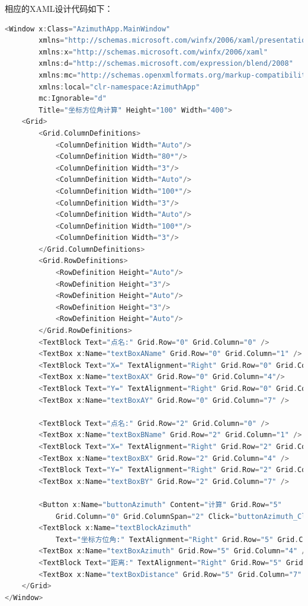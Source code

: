 相应的XAML设计代码如下：

\begin{lstlisting}[language=C]
<Window x:Class="AzimuthApp.MainWindow"
        xmlns="http://schemas.microsoft.com/winfx/2006/xaml/presentation"
        xmlns:x="http://schemas.microsoft.com/winfx/2006/xaml"
        xmlns:d="http://schemas.microsoft.com/expression/blend/2008"
        xmlns:mc="http://schemas.openxmlformats.org/markup-compatibility/2006"
        xmlns:local="clr-namespace:AzimuthApp"
        mc:Ignorable="d"
        Title="坐标方位角计算" Height="100" Width="400">
    <Grid>
        <Grid.ColumnDefinitions>
            <ColumnDefinition Width="Auto"/>
            <ColumnDefinition Width="80*"/>
            <ColumnDefinition Width="3"/>
            <ColumnDefinition Width="Auto"/>
            <ColumnDefinition Width="100*"/>
            <ColumnDefinition Width="3"/>
            <ColumnDefinition Width="Auto"/>
            <ColumnDefinition Width="100*"/>
            <ColumnDefinition Width="3"/>
        </Grid.ColumnDefinitions>
        <Grid.RowDefinitions>
            <RowDefinition Height="Auto"/>
            <RowDefinition Height="3"/>
            <RowDefinition Height="Auto"/>
            <RowDefinition Height="3"/>
            <RowDefinition Height="Auto"/>
        </Grid.RowDefinitions>
        <TextBlock Text="点名:" Grid.Row="0" Grid.Column="0" />
        <TextBox x:Name="textBoxAName" Grid.Row="0" Grid.Column="1" />
        <TextBlock Text="X=" TextAlignment="Right" Grid.Row="0" Grid.Column="3"/>
        <TextBox x:Name="textBoxAX" Grid.Row="0" Grid.Column="4"/>
        <TextBlock Text="Y=" TextAlignment="Right" Grid.Row="0" Grid.Column="6"/>
        <TextBox x:Name="textBoxAY" Grid.Row="0" Grid.Column="7" />

        <TextBlock Text="点名:" Grid.Row="2" Grid.Column="0" />
        <TextBox x:Name="textBoxBName" Grid.Row="2" Grid.Column="1" />
        <TextBlock Text="X=" TextAlignment="Right" Grid.Row="2" Grid.Column="3"/>
        <TextBox x:Name="textBoxBX" Grid.Row="2" Grid.Column="4" />
        <TextBlock Text="Y=" TextAlignment="Right" Grid.Row="2" Grid.Column="6"/>
        <TextBox x:Name="textBoxBY" Grid.Row="2" Grid.Column="7" />

        <Button x:Name="buttonAzimuth" Content="计算" Grid.Row="5" 
            Grid.Column="0" Grid.ColumnSpan="2" Click="buttonAzimuth_Click"/>
        <TextBlock x:Name="textBlockAzimuth" 
            Text="坐标方位角:" TextAlignment="Right" Grid.Row="5" Grid.Column="3"/>
        <TextBox x:Name="textBoxAzimuth" Grid.Row="5" Grid.Column="4" />
        <TextBlock Text="距离:" TextAlignment="Right" Grid.Row="5" Grid.Column="6" />
        <TextBox x:Name="textBoxDistance" Grid.Row="5" Grid.Column="7" />
    </Grid>
</Window>
\end{lstlisting}

